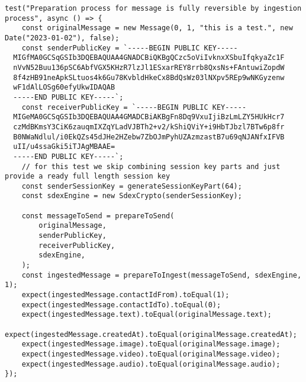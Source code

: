 \documentclass[../main.tex]{subfiles}
\begin{document}
\begin{lstlisting}[caption={Test integracyjny sprawdzający poprawność przygotowywania wiadomości do wysyłki, a następnie do jej zapisania u odbiorcy}]
test("Preparation process for message is fully reversible by ingestion process", async () => {
    const originalMessage = new Message(0, 1, "this is a test.", new Date("2023-01-02"), false);
    const senderPublicKey = `-----BEGIN PUBLIC KEY-----
  MIGfMA0GCSqGSIb3DQEBAQUAA4GNADCBiQKBgQCzc5oViIvknxXSbuIfqkyaZc1F
  nVvN52Buu136pSC6AbfVGX5KHzR7lzJl1ESxarREY8rrb8QxsNs+FAntuwiZopdW
  8f4zHB91neApkSLtuos4k6Gu78KvbldHkeCx8BdQsWz03lNXpv5REp9wNKGyzenw
  wF1dAlLOSg60efyUkwIDAQAB
  -----END PUBLIC KEY-----`;
    const receiverPublicKey = `-----BEGIN PUBLIC KEY-----
  MIGeMA0GCSqGSIb3DQEBAQUAA4GMADCBiAKBgFn8Dq9VxuIjiBzLmLZY5HUkHcr7
  czMdBKmsY3CiK6zauqmIXZqYLadVJBTh2+v2/kShiQViY+i9HbTJbzl7BTw6p8fr
  B0NWaNdlul/i0EkQZs45dJHe2HZebw7ZbOJmPyhUZAzmzastB7u69qNJANfxIFVB
  uII/u4ssaGki5iTJAgMBAAE=
  -----END PUBLIC KEY-----`;
    // for this test we skip combining session key parts and just provide a ready full length session key
    const senderSessionKey = generateSessionKeyPart(64);
    const sdexEngine = new SdexCrypto(senderSessionKey);

    const messageToSend = prepareToSend(
        originalMessage,
        senderPublicKey,
        receiverPublicKey,
        sdexEngine,
    );
    const ingestedMessage = prepareToIngest(messageToSend, sdexEngine, 1);
    expect(ingestedMessage.contactIdFrom).toEqual(1);
    expect(ingestedMessage.contactIdTo).toEqual(0);
    expect(ingestedMessage.text).toEqual(originalMessage.text);
    expect(ingestedMessage.createdAt).toEqual(originalMessage.createdAt);
    expect(ingestedMessage.image).toEqual(originalMessage.image);
    expect(ingestedMessage.video).toEqual(originalMessage.video);
    expect(ingestedMessage.audio).toEqual(originalMessage.audio);
});
\end{lstlisting}

\newpage
\end{document}
